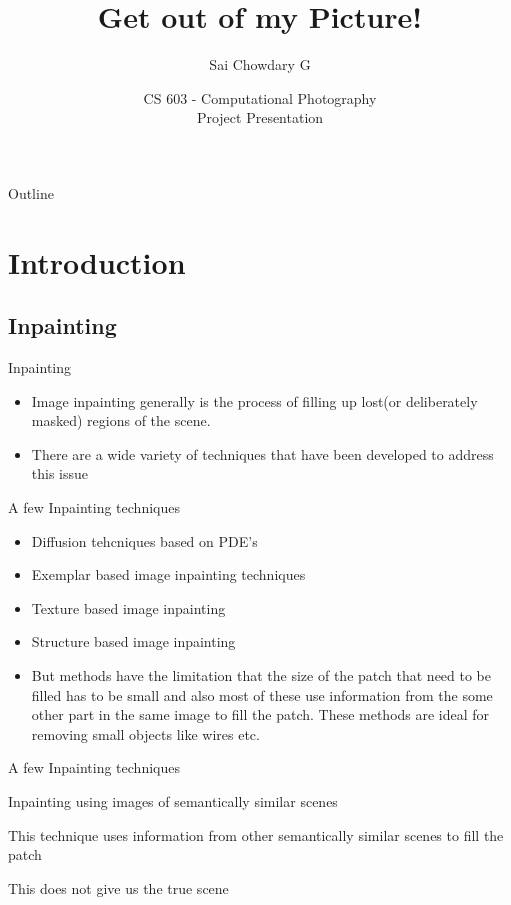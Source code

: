 \documentclass{beamer}
\title{Get out of my Picture!}
\author{Sai Chowdary G }
\institute[IITGN] %
{
  Electrical Engineering\\
  Indian Institute of Technology, Gandhinagar
  }
\date{CS 603 - Computational Photography\\ Project Presentation}
\begin{document}
\begin{frame}
  \titlepage
\end{frame}

\begin{frame}{Outline}
  \tableofcontents
\end{frame}

\section{Introduction}

\subsection{Inpainting}

\begin{frame}{Inpainting}
  \begin{itemize}
  \item {
    Image inpainting generally is the process of filling up lost(or deliberately masked) regions of the scene.
  }
  \item {
  There are a wide variety of techniques that have been developed to address this issue
  }
 
  \end{itemize}
\end{frame}

\begin{frame}{A few Inpainting techniques}
  \begin{itemize}
  \item {
   Diffusion tehcniques based on PDE's \cite{1}
  }
  \item {
  Exemplar based image inpainting techniques \cite{2}
  }
  \item {
  Texture based image inpainting \cite{3}
  }
   \item {
  Structure based image inpainting \cite{4}
  }
   \item {
  But methods have the limitation that the size of the patch that need to be filled has to be small and also most of these use information from the some other part in the same image to fill the patch. These methods are ideal for removing small objects like wires etc. 
  }
  \end{itemize}
\end{frame}
\begin{frame}{A few Inpainting techniques}
\item {
  Inpainting using images of semantically similar scenes \cite{5}
  }
   \item {This technique uses information from other semantically similar scenes to fill the patch}
    \item {This does not give us the true scene}
\end{frame}
\end{document}
